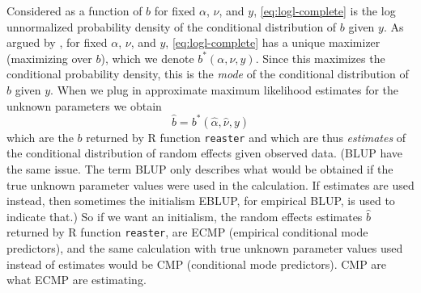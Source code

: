 \documentclass[11pt]{article}
\let\code=\texttt
\begin{document}
Considered as a function of $b$ for fixed $\alpha$, $\nu$, and $y$,
\eqref{eq:logl-complete} is the log unnormalized probability density of the
conditional distribution of $b$ given $y$.  As argued by \citet{reaster},
for fixed $\alpha$, $\nu$, and $y$, \eqref{eq:logl-complete} has a unique
maximizer (maximizing over $b$), which we denote $b^*(\alpha, \nu, y)$.
Since this maximizes the conditional probability density, this is the
\emph{mode} of the conditional distribution of $b$ given $y$.
When we plug in approximate maximum likelihood estimates for the unknown
parameters we obtain
\begin{equation*}
   \hat{b} = b^*(\hat{\alpha}, \hat{\nu}, y)
\end{equation*}
which are the $b$ returned by R function \code{reaster} and which are thus
\emph{estimates} of the conditional distribution of random effects given
observed data.  (BLUP have the same issue.  The term BLUP only describes
what would be obtained if the true unknown parameter values were used in
the calculation.  If estimates are used instead, then sometimes the
initialism EBLUP, for empirical BLUP, is used to indicate that.)
So if we want an initialism, the random effects estimates $\hat{b}$ returned
by R function \code{reaster}, are ECMP (empirical conditional mode predictors),
and the same calculation with true unknown parameter values used instead
of estimates would be CMP (conditional mode predictors).
CMP are what ECMP are estimating.
\end{document}
